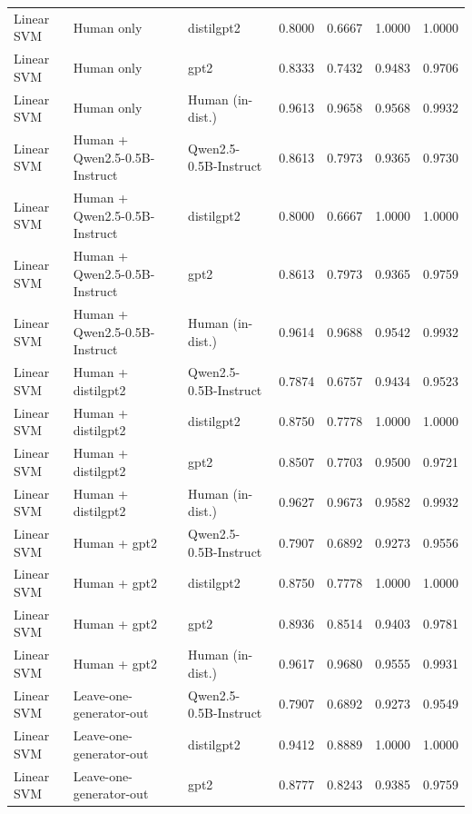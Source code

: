 \begin{tabular}{lllrrrr}
Linear SVM & Human only & distilgpt2 & 0.8000 & 0.6667 & 1.0000 & 1.0000 \\
Linear SVM & Human only & gpt2 & 0.8333 & 0.7432 & 0.9483 & 0.9706 \\
Linear SVM & Human only & Human (in-dist.) & 0.9613 & 0.9658 & 0.9568 & 0.9932 \\
Linear SVM & Human + Qwen2.5-0.5B-Instruct & Qwen2.5-0.5B-Instruct & 0.8613 & 0.7973 & 0.9365 & 0.9730 \\
Linear SVM & Human + Qwen2.5-0.5B-Instruct & distilgpt2 & 0.8000 & 0.6667 & 1.0000 & 1.0000 \\
Linear SVM & Human + Qwen2.5-0.5B-Instruct & gpt2 & 0.8613 & 0.7973 & 0.9365 & 0.9759 \\
Linear SVM & Human + Qwen2.5-0.5B-Instruct & Human (in-dist.) & 0.9614 & 0.9688 & 0.9542 & 0.9932 \\
Linear SVM & Human + distilgpt2 & Qwen2.5-0.5B-Instruct & 0.7874 & 0.6757 & 0.9434 & 0.9523 \\
Linear SVM & Human + distilgpt2 & distilgpt2 & 0.8750 & 0.7778 & 1.0000 & 1.0000 \\
Linear SVM & Human + distilgpt2 & gpt2 & 0.8507 & 0.7703 & 0.9500 & 0.9721 \\
Linear SVM & Human + distilgpt2 & Human (in-dist.) & 0.9627 & 0.9673 & 0.9582 & 0.9932 \\
Linear SVM & Human + gpt2 & Qwen2.5-0.5B-Instruct & 0.7907 & 0.6892 & 0.9273 & 0.9556 \\
Linear SVM & Human + gpt2 & distilgpt2 & 0.8750 & 0.7778 & 1.0000 & 1.0000 \\
Linear SVM & Human + gpt2 & gpt2 & 0.8936 & 0.8514 & 0.9403 & 0.9781 \\
Linear SVM & Human + gpt2 & Human (in-dist.) & 0.9617 & 0.9680 & 0.9555 & 0.9931 \\
Linear SVM & Leave-one-generator-out & Qwen2.5-0.5B-Instruct & 0.7907 & 0.6892 & 0.9273 & 0.9549 \\
Linear SVM & Leave-one-generator-out & distilgpt2 & 0.9412 & 0.8889 & 1.0000 & 1.0000 \\
Linear SVM & Leave-one-generator-out & gpt2 & 0.8777 & 0.8243 & 0.9385 & 0.9759 \\
\bottomrule
\end{tabular}
